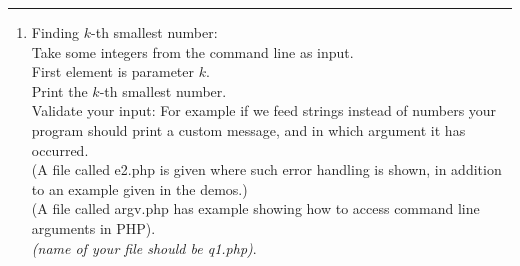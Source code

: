 \documentclass{article}
\begin{document}
\hrule
\noindent
\begin{enumerate}  
\item Finding $k$-th smallest number:\\
      Take some integers from the command line as input. \\
      First element is parameter $k$.\\
      Print the $k$-th smallest number. \\

      Validate your input: For example if we feed strings instead of numbers your program should 
      print a custom message, and in which argument it has occurred. \\
 
      (A file called e2.php is given where such error handling is shown, in addition to an example given in the demos.)\\

      (A file called argv.php has example showing how to access command line arguments in PHP). \\
   

     \emph{(name of your file should be q1.php)}. 
 
%
%
%
% 
\end{enumerate} 
\end{document}
